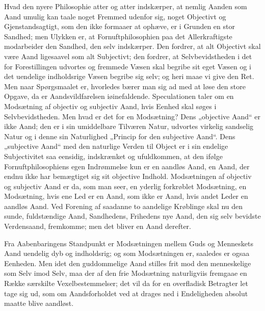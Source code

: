 \documentclass[12pt]{book}
\begin{document}
Hvad den nyere Philosophie atter og atter indskærper, at nemlig
Aanden som Aand umulig kan taale noget Fremmed udenfor sig, noget
Objectivt og Gjenstandsagtigt, som den ikke formaaer at ophæve, er i
Grunden en stor Sandhed; men Ulykken er, at Fornuftphilosophien paa
det Allerkraftigste modarbeider den Sandhed, den selv indskærper.
Den fordrer, at alt Objectivt skal være Aand ligesaavel som alt
Subjectivt; den fordrer, at Selvbevidstheden i det for
Forestillingen udvortes og fremmede Væsen skal begribe sit eget
Væsen og i det uendelige indholdsrige Væsen begribe sig selv; og
heri maae vi give den Ret. Men naar Spørgsmaalet er, hvorledes bærer
man sig ad med at løse den store Opgave, da er Aandsvildfarelsen
iøinefaldende. Speculationen taler om en Modsætning af objectiv og
subjectiv Aand, hvis Eenhed skal søges i Selvbevidstheden. Men hvad
er det for en Modsætning? Dens „objective Aand“ er ikke Aand; den er
i sin umiddelbare Tilværen Natur, udvortes virkelig sandselig Natur
og i denne sin Naturlighed „Princip for den subjective Aand“. Dens
„subjective Aand“ med den naturlige Verden til Object er i sin
endelige Subjectivitet saa eensidig, indskrænket og ufuldkommen, at
den ifølge Fornuftphilosophiens egen Indrømmelse kun er en aandløs
Aand, en Aand, der endnu ikke har bemægtiget sig sit objective
Indhold. Modsætningen af objectiv og subjectiv Aand er da, som man
seer, en yderlig forkrøblet Modsætning, en Modsætning, hvis ene Led
er en Aand, som ikke er Aand, hvis andet Leder en aandløs Aand.
Ved Forening af saadanne to aandelige Krøblinge skal nu den sunde,
fuldstændige Aand, Sandhedens, Frihedens nye Aand, den sig selv
bevidste Verdensaand, fremkomme; men det bliver en Aand derefter.

Fra Aabenbaringens Standpunkt er Modsætningen
mellem Guds og Menneskets Aand uendelig dyb og indholdsrig; og som
Modsætningen er, saaledes er ogsaa Eenheden. Men idet den
guddommelige Aand stilles frit mod den menneskelige som Selv imod
Selv, maa der af den frie Modsætning naturligviis fremgaae en Række
særskilte Vexelbestemmelser; det vil da for en overfladisk Betragter
let tage sig ud, som om Aandsforholdet ved at drages ned i
Endeligheden absolut maatte blive aandløst.
\end{document}
